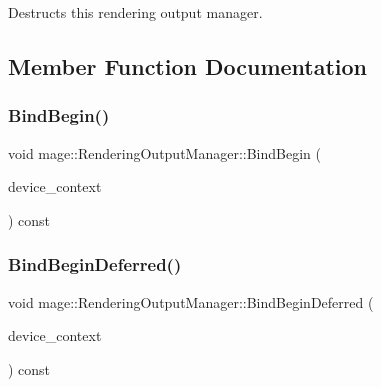 Destructs this rendering output manager. 

\subsection{Member Function Documentation}
\hypertarget{classmage_1_1_rendering_output_manager_aca82046ea30351c98e652571fef0ebf3}{}\label{classmage_1_1_rendering_output_manager_aca82046ea30351c98e652571fef0ebf3} 
\subsubsection{\texorpdfstring{Bind\+Begin()}{BindBegin()}}
{\footnotesize\ttfamily void mage\+::\+Rendering\+Output\+Manager\+::\+Bind\+Begin (\begin{DoxyParamCaption}\item[{I\+D3\+D11\+Device\+Context4 $\ast$}]{device\+\_\+context }\end{DoxyParamCaption}) const\hspace{0.3cm}{\ttfamily [noexcept]}}

\hypertarget{classmage_1_1_rendering_output_manager_ae9fa2b0bfe9e8d935d5dc99288acaf78}{}\label{classmage_1_1_rendering_output_manager_ae9fa2b0bfe9e8d935d5dc99288acaf78} 
\subsubsection{\texorpdfstring{Bind\+Begin\+Deferred()}{BindBeginDeferred()}}
{\footnotesize\ttfamily void mage\+::\+Rendering\+Output\+Manager\+::\+Bind\+Begin\+Deferred (\begin{DoxyParamCaption}\item[{I\+D3\+D11\+Device\+Context4 $\ast$}]{device\+\_\+context }\end{DoxyParamCaption}) const\hspace{0.3cm}{\ttfamily [noexcept]}}

\hypertarget{classmage_1_1_rendering_output_manager_aaedc2fef9e4b69da6dcd264609225420}{}\label{classmage_1_1_rendering_output_manager_aaedc2fef9e4b69da6dcd264609225420} 
